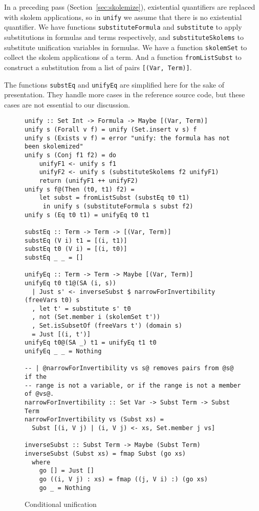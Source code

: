 \documentclass[sigconf]{acmart}
\newcommand{\tc}[1]{{\small\texttt{#1}}}
\begin{document}
In a preceding pass (Section~\ref{sec:skolemize}), existential quantifiers are replaced
with skolem applications, so in \tc{unify} we assume that there is no
existential quantifier. We have functions \tc{substituteFormula} and \tc{substitute}
to apply substitutions in formulas and terms respectively, and \tc{substituteSkolems} to  substitute
unification variables in formulas. We have a function \tc{skolemSet} to collect the skolem applications of a
term. And a function \tc{fromListSubst} to construct a substitution from a list of
pairs \tc{[(Var, Term)]}.

The functions \tc{substEq} and \tc{unifyEq} are simplified here for the sake of presentation.
They handle more cases in the reference source code, but these cases are not essential to our
discussion.

\begin{figure}
\begin{verbatim}
unify :: Set Int -> Formula -> Maybe [(Var, Term)]
unify s (Forall v f) = unify (Set.insert v s) f
unify s (Exists v f) = error "unify: the formula has not been skolemized"
unify s (Conj f1 f2) = do
    unifyF1 <- unify s f1
    unifyF2 <- unify s (substituteSkolems f2 unifyF1)
    return (unifyF1 ++ unifyF2)
unify s f@(Then (t0, t1) f2) =
    let subst = fromListSubst (substEq t0 t1)
     in unify s (substituteFormula s subst f2)
unify s (Eq t0 t1) = unifyEq t0 t1

substEq :: Term -> Term -> [(Var, Term)]
substEq (V i) t1 = [(i, t1)]
substEq t0 (V i) = [(i, t0)]
substEq _ _ = []

unifyEq :: Term -> Term -> Maybe [(Var, Term)]
unifyEq t0 t1@(SA (i, s))
  | Just s' <- inverseSubst $ narrowForInvertibility (freeVars t0) s
  , let t' = substitute s' t0
  , not (Set.member i (skolemSet t'))
  , Set.isSubsetOf (freeVars t') (domain s)
  = Just [(i, t')]
unifyEq t0@(SA _) t1 = unifyEq t1 t0
unifyEq _ _ = Nothing

-- | @narrowForInvertibility vs s@ removes pairs from @s@ if the
-- range is not a variable, or if the range is not a member of @vs@.
narrowForInvertibility :: Set Var -> Subst Term -> Subst Term
narrowForInvertibility vs (Subst xs) =
  Subst [(i, V j) | (i, V j) <- xs, Set.member j vs]

inverseSubst :: Subst Term -> Maybe (Subst Term)
inverseSubst (Subst xs) = fmap Subst (go xs)
  where
    go [] = Just []
    go ((i, V j) : xs) = fmap ((j, V i) :) (go xs)
    go _ = Nothing
\end{verbatim}
\caption{Conditional unification}
\label{conditional-unification}
\end{figure}
\end{document}
